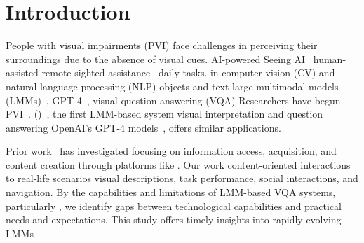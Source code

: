 \section{Introduction}

People with visual impairments (PVI) face challenges in perceiving their surroundings due to the absence of visual cues.  AI-powered  Seeing AI~\cite{SeeingAI2020}  human-assisted  remote sighted assistance~\cite{BeMyEyes2020}  daily tasks.  in computer vision (CV) and natural language processing (NLP)  objects and text  large multimodal models (LMMs)~\cite{yu2023mm},  GPT-4~\cite{achiam2023gpt},  visual question-answering (VQA)  Researchers have begun  PVI~\cite{zhao2024vialm, yang2024viassist}.  \textit{\bma{}} (\sbma{})~\cite{bma_usecase}, the first  LMM-based system  visual interpretation and question answering OpenAI's GPT-4 models~\cite{achiam2023gpt}, \sbma{} offers  similar applications.

Prior work~\cite{adnin2024look} has investigated  focusing on information access, acquisition, and content creation through platforms like \bma. Our work  content-oriented interactions to  real-life scenarios  visual descriptions, task performance, social interactions, and navigation. By  the capabilities and limitations of LMM-based VQA systems, particularly \bma{}, we identify gaps between  technological capabilities and  practical needs and expectations. 
This study offers timely insights into rapidly evolving LMMs  


